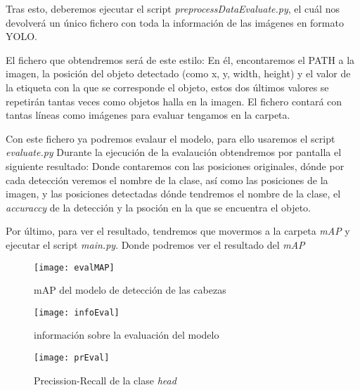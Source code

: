 
Tras esto, deberemos ejecutar el script \textit{preprocessDataEvaluate.py}, el cuál nos devolverá un único fichero con toda la información de las imágenes en formato YOLO.

El fichero que obtendremos será de este estilo:
En él, encontaremos el PATH a la imagen, la posición del objeto detectado (como x, y, width, height) y el valor de la etiqueta con la que se corresponde el objeto, estos dos últimos valores se repetirán tantas veces como objetos halla en la imagen. El fichero contará con tantas líneas como imágenes para evaluar tengamos en la carpeta.

Con este fichero ya podremos evalaur el modelo, para ello usaremos el script \textit{evaluate.py}
Durante la ejecución de la evalaución obtendremos por pantalla el siguiente resultado:
Donde contaremos con las posiciones originales, dónde por cada detección veremos el nombre de la clase, así como las posiciones de la imagen, y las posiciones detectadas dónde tendremos el nombre de la clase, el \textit{accuraccy} de la detección y la psoción en la que se encuentra el objeto.

Por último, para ver el resultado, tendremos que movermos a la carpeta \textit{mAP} y ejecutar el script \textit{main.py}.
Donde podremos ver el resultado del \textit{mAP}

\begin{figure}[!h]
    \centering
    \texttt{[image: evalMAP]}
    \caption{mAP del modelo de detección de las cabezas}\label{fig:evalMAP}
\end{figure}

\begin{figure}[!h]
    \centering
    \texttt{[image: infoEval]}
    \caption{información sobre la evaluación del modelo}\label{fig:infoEval}
\end{figure}

\begin{figure}[!h]
    \centering
    \texttt{[image: prEval]}
    \caption{Precission-Recall de la clase \textit{head}}\label{fig:prEval}
\end{figure}
